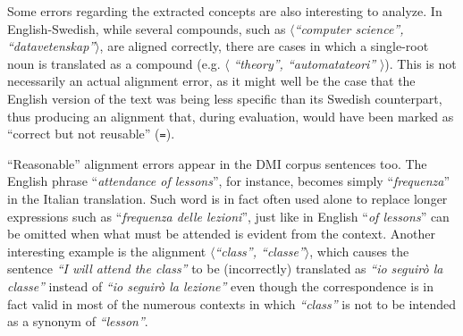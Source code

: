 Some errors regarding the extracted concepts are also interesting to analyze.
In English-Swedish, while several compounds, such as $\langle$\textit{``computer science'', ``datavetenskap''}$\rangle$, are aligned correctly, there are cases in which a single-root noun is translated as a compound (e.g. $\langle$ \textit{``theory'', ``automatateori''} $\rangle$). This is not necessarily an actual alignment error, as it might well be the case that the English version of the text was being less specific than its Swedish counterpart, thus producing an alignment that, during evaluation, would have been marked as ``correct but not reusable'' (\texttt{=}). \smallskip

``Reasonable'' alignment errors appear in the DMI corpus sentences too. 
The English phrase ``\textit{attendance of lessons}'', for instance, becomes simply ``\textit{frequenza}'' in the Italian translation. 
Such word is in fact often used alone to replace longer expressions such as ``\textit{frequenza delle lezioni}'', just like in English ``\textit{of lessons}'' can be omitted when what must be attended is evident from the context.
Another interesting example is the alignment $\langle$\textit{``class'', ``classe''}$\rangle$, which causes the sentence \textit{``I will attend the class''} to be (incorrectly) translated as \textit{``io seguirò la classe''} instead of \textit{``io seguirò la lezione''} even though the correspondence is in fact valid in most of the numerous contexts in which \textit{``class''} is not to be intended as a synonym of \textit{``lesson''}.